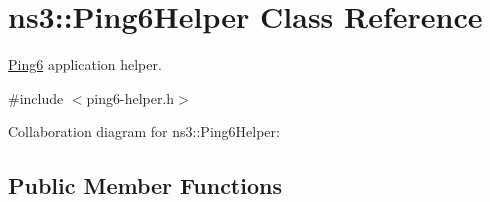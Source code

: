 \hypertarget{classns3_1_1Ping6Helper}{}\section{ns3\+:\+:Ping6\+Helper Class Reference}
\label{classns3_1_1Ping6Helper}


\hyperlink{classns3_1_1Ping6}{Ping6} application helper.  




{\ttfamily \#include $<$ping6-\/helper.\+h$>$}



Collaboration diagram for ns3\+:\+:Ping6\+Helper\+:
\subsection*{Public Member Functions}
